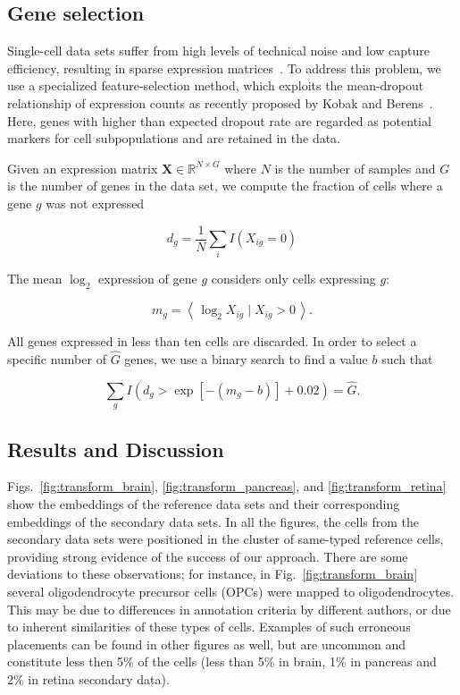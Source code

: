 \documentclass[runningheads]{llncs}
\begin{document}
\subsection{Gene selection\label{sec:gene-selection}}

Single-cell data sets suffer from high levels of technical noise and low
capture efficiency, resulting in sparse expression matrices~\cite{umi}. To
address this problem, we use a specialized feature-selection method, which
exploits the mean-dropout relationship of expression counts as recently
proposed by Kobak and Berens~\cite{art_of_using_tsne}. Here, genes with higher
than expected dropout rate are regarded as potential markers for cell
subpopulations and are retained in the data.

Given an expression matrix $\mathbf{X} \in \mathbb{R}^{N \times G}$ where $N$
is the number of samples and $G$ is the number of genes in the data set, we
compute the fraction of cells where a gene $g$ was not expressed

\begin{equation}
d_g = \frac{1}{N} \sum_i I \left ( X_{ig} = 0\right )
\end{equation}

\noindent The mean $\log_2$ expression of gene $g$ considers only cells
expressing $g$:

\begin{equation}
m_g = \left \langle \, \log_2 X_{ig} \mid X_{ig} > 0 \, \right \rangle.
\end{equation}

All genes expressed in less than ten cells are discarded. In order to select a
specific number of $\hat{G}$ genes, we use a binary search to find a value $b$
such that

\begin{equation}
\sum_g I \left (d_g > \exp \left [ -(m_g - b) \right ] + 0.02 \right ) = \hat{G}.
\end{equation}

\subsection{Results and Discussion}
\label{sec:results}

Figs.~\ref{fig:transform_brain}, \ref{fig:transform_pancreas}, and
\ref{fig:transform_retina} show the embeddings of the reference data sets and
their corresponding embeddings of the secondary data sets. In all the figures,
the cells from the secondary data sets were positioned in the cluster of
same-typed reference cells, providing strong evidence of the success of our approach. There are some deviations to these observations; for
instance, in Fig.~\ref{fig:transform_brain} several oligodendrocyte precursor
cells (OPCs) were mapped to oligodendrocytes. This may be due to differences in
annotation criteria by different authors, or due to inherent similarities of
these types of cells. Examples of such erroneous placements can be found in
other figures as well, but are uncommon and constitute less then 5\% of
the cells (less than 5\% in brain, 1\% in pancreas and 2\% in retina
secondary data).
\end{document}
